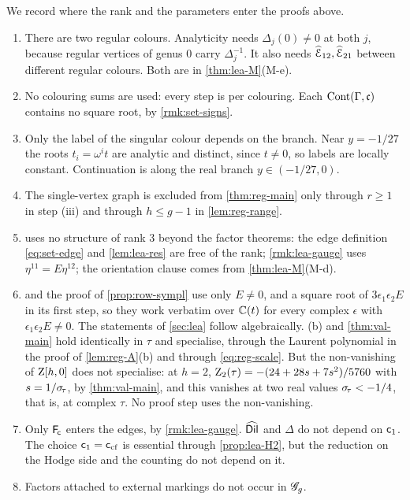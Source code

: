 \begin{rmk}
\label{rmk:reg-rank}
We record where the rank and the parameters enter the proofs above.
\begin{enumerate}
\item[(a)] There are two regular colours. Analyticity needs $\Delta_j(0)\neq 0$ at both $j$, because regular vertices of genus $0$ carry $\Delta_j^{-1}$. It also needs $\widehat{\mathcal{E}}_{12},\widehat{\mathcal{E}}_{21}$ between different regular colours. Both are in \cref{thm:lea-M}(M-e).
\item[(b)] No colouring sums are used: every step is per colouring. Each $\mathrm{Cont}(\Gamma,\mathfrak{c})$ contains no square root, by \cref{rmk:set-signs}.
\item[(c)] Only the label of the singular colour depends on the branch. Near $y=-1/27$ the roots $t_i=\omega^it$ are analytic and distinct, since $t\neq 0$, so labels are locally constant. Continuation is along the real branch $y\in(-1/27,0)$.
\item[(d)] The single-vertex graph is excluded from \cref{thm:reg-main} only through $r\geq 1$ in step (iii) and through $h\leq g-1$ in \cref{lem:reg-range}.
\item[(e)]  uses no structure of rank $3$ beyond the factor theorems: the edge definition \cref{eq:set-edge} and \cref{lem:lea-res} are free of the rank; \cref{rmk:lea-gauge} uses $\eta^{11}=E\eta^{12}$; the orientation clause comes from \cref{thm:lea-M}(M-d).
\item[(f)]  and the proof of \cref{prop:row-sympl} use only $E\neq 0$, and a square root of $3\epsilon_1\epsilon_2E$ in its first step, so they work verbatim over $\mathbb{C}(t)$ for every complex $\epsilon$ with $\epsilon_1\epsilon_2E\neq 0$. The statements of \cref{sec:lea} follow algebraically. (b) and \cref{thm:val-main} hold identically in $\tau$ and specialise, through the Laurent polynomial in the proof of \cref{lem:reg-A}(b) and through \cref{eq:reg-scale}. But the non-vanishing of $\mathrm{Z}[h,0]$ does not specialise: at $h=2$, $\mathrm{Z}_2(\tau)=-(24+28s+7s^2)/5760$ with $s=1/\sigma_{\!\tau}$, by \cref{thm:val-main}, and this vanishes at two real values $\sigma_{\!\tau}<-1/4$, that is, at complex $\tau$. No proof step uses the non-vanishing.
\item[(g)] Only $\mathsf{F}_{\!\mathsf{c}}$ enters the edges, by \cref{rmk:lea-gauge}. $\widehat{\mathsf{Dil}}$ and $\Delta$ do not depend on $\mathsf{c}_{1}$. The choice $\mathsf{c}_{1}=\mathsf{c}_{\mathrm{cf}}$ is essential through \cref{prop:lea-H2}, but the reduction on the Hodge side and the counting do not depend on it.
\item[(h)] Factors attached to external markings do not occur in $\mathscr{G}_g$.
\end{enumerate}
\end{rmk}

